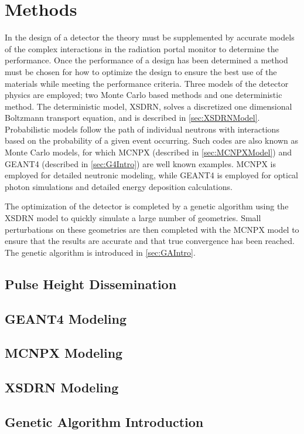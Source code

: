 \chapter{Methods}
\label{chap:methods}
In the design of a detector the theory must be supplemented by accurate models of the complex interactions in the radiation portal monitor to determine the performance.
Once the performance of a design has been determined a method must be chosen for how to optimize the design to  ensure the best use of the materials while meeting the performance criteria.
Three models of the detector physics are employed; two Monte Carlo based methods and one deterministic method.
The deterministic model, XSDRN, solves a discretized one dimensional Boltzmann transport equation, and is described in \autoref{sec:XSDRNModel}.
Probabilistic models follow the path of individual neutrons with interactions based on the probability of a given event occurring.
Such codes are also known as Monte Carlo models, for which MCNPX (described in \autoref{sec:MCNPXModel}) and GEANT4 (described in \autoref{sec:G4Intro}) are well known examples.
MCNPX is employed for detailed neutronic modeling, while GEANT4 is employed for optical photon simulations and detailed energy deposition calculations.

The optimization of the detector is completed by a genetic algorithm using the XSDRN model to quickly simulate a large number of geometries.
Small perturbations on these geometries are then completed with the MCNPX model to ensure that the results are accurate and that true convergence has been reached.
The genetic algorithm is introduced in \autoref{sec:GAIntro}.

\section{Pulse Height Dissemination}
\label{sec:PulseHeightDiscrm}


\section{GEANT4 Modeling}
\label{sec:G4Intro}


\section{MCNPX Modeling}
\label{sec:MCNPXModel}


\section{XSDRN Modeling}
\label{sec:XSDRNModel}


\section{Genetic Algorithm Introduction}
\label{sec:GAIntro}

